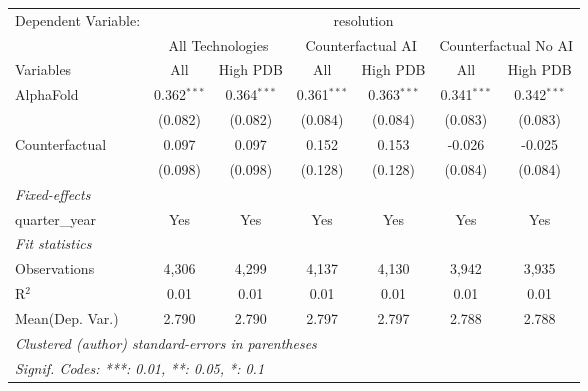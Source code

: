 \begingroup
\centering
\begin{tabular}{lcccccc}
   \tabularnewline \midrule \midrule
   Dependent Variable: & \multicolumn{6}{c}{resolution}\\
 & \multicolumn{2}{c}{All Technologies} & \multicolumn{2}{c}{Counterfactual AI} & \multicolumn{2}{c}{Counterfactual No AI} \\
\cmidrule(lr){1-1}\cmidrule(lr){2-3} \cmidrule(lr){4-5} \cmidrule(lr){6-7}
Variables & \multicolumn{1}{c}{All} & \multicolumn{1}{c}{High PDB} & \multicolumn{1}{c}{All} & \multicolumn{1}{c}{High PDB} & \multicolumn{1}{c}{All} & \multicolumn{1}{c}{High PDB} \\
\cmidrule(lr){1-1}\cmidrule(lr){2-2} \cmidrule(lr){3-3} \cmidrule(lr){4-4} \cmidrule(lr){5-5} \cmidrule(lr){6-6} \cmidrule(lr){7-7}
   AlphaFold      & 0.362$^{***}$ & 0.364$^{***}$ & 0.361$^{***}$ & 0.363$^{***}$ & 0.341$^{***}$ & 0.342$^{***}$\\   
                  & (0.082)       & (0.082)       & (0.084)       & (0.084)       & (0.083)       & (0.083)\\   
   Counterfactual & 0.097         & 0.097         & 0.152         & 0.153         & -0.026        & -0.025\\   
                  & (0.098)       & (0.098)       & (0.128)       & (0.128)       & (0.084)       & (0.084)\\   
   \midrule
   \emph{Fixed-effects}\\
   quarter\_year  & Yes           & Yes           & Yes           & Yes           & Yes           & Yes\\  
   \midrule
   \emph{Fit statistics}\\
   Observations   & 4,306         & 4,299         & 4,137         & 4,130         & 3,942         & 3,935\\  
   R$^2$          & 0.01          & 0.01          & 0.01          & 0.01          & 0.01          & 0.01\\  
Mean(Dep. Var.) & 2.790 & 2.790 & 2.797 & 2.797 & 2.788 & 2.788 \\
   \midrule \midrule
   \multicolumn{7}{l}{\emph{Clustered (author) standard-errors in parentheses}}\\
   \multicolumn{7}{l}{\emph{Signif. Codes: ***: 0.01, **: 0.05, *: 0.1}}\\
\end{tabular}
\par\endgroup
